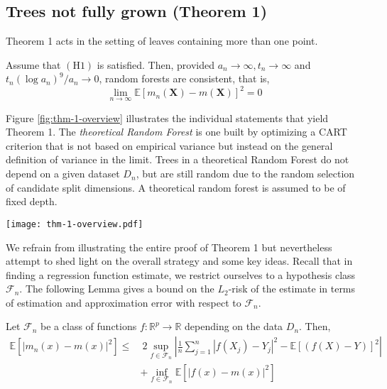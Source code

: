\documentclass[10pt]{article}
\theoremstyle{definition}
\begin{document}
\subsection{Trees not fully grown (Theorem 1)}



Theorem 1 acts in the setting of leaves containing more than one point.

\begin{mainthm}
  Assume that $(\mathrm{H} 1)$ is satisfied. Then, provided $a_n \rightarrow
  \infty, t_n \rightarrow \infty$ and $t_n\left(\log a_n\right)^9 / a_n
  \rightarrow 0$, random forests are consistent, that is,
  $$
  \lim _{n \rightarrow \infty} \mathbb{E}\left[m_n(\mathbf{X})-m(\mathbf{X})\right]^2=0
  $$
\end{mainthm}

Figure \ref{fig:thm-1-overview} illustrates the individual statements that yield
Theorem 1. The \textit{theoretical Random Forest} is one built by optimizing a
CART criterion that is not based on empirical variance but instead on the general
definition of variance in the limit.
Trees in a theoretical Random Forest do not depend on a given dataset $D_n$, but
are still random due to the random selection of candidate split dimensions. A theoretical
random forest is assumed to be of fixed depth.


\begin{figure*}[h]
  \centering
  \texttt{[image: thm-1-overview.pdf]}
  \caption{Overview of the proof of Theorem 1 (omitting Technical Lemma 1 and Lemma 2). }
  \label{fig:thm-1-overview}
\end{figure*}


We refrain from illustrating the entire proof of Theorem 1 but nevertheless
attempt to shed light on the overall strategy and some key ideas. 
Recall that in finding a regression
function estimate, we restrict ourselves to a hypothesis class $\mathcal{F}_n$.
The following Lemma gives a bound on the $L_2$-risk of the estimate in terms of
estimation and approximation error with respect to $\mathcal{F}_n$.

\begin{lemma}
  Let
  $\mathcal{F}_n$ be a class of functions $f:
  \mathbb{R}^p \to \mathbb{R}$ depending on the data
  $D_n$. 
  Then,
  \begin{align*}
    \mathbb{E}\left[ \left|m_n(x)-m(x)\right|^2 \right] \leq
    & ~ 2 \sup _{f \in \mathcal{F}_n}
      \left|
      \frac{1}{n}
      \sum_{j=1}^n
      \left| f\left(X_j\right)-Y_j\right|^2-\mathbb{E}\left[(f(X)-Y)\right]^2
      \right| \\
      & +\inf _{f \in \mathcal{F}_n} \mathbb{E}\left[\left|f(x)-m(x)\right|^2  \right]
  \end{align*}
\end{lemma}
\end{document}
